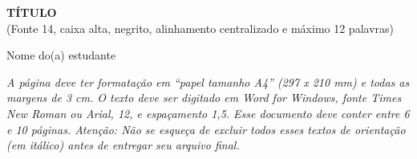 \begin{center}
{\Large\bfseries\MakeUppercase{TÍTULO}}\\[0.3\baselineskip]
{\footnotesize (Fonte 14, caixa alta, negrito, alinhamento centralizado e máximo 12 palavras)}
\end{center}

\vspace{0.7\baselineskip}
\begin{flushright}
Nome do(a) estudante
\end{flushright}

\vspace{1.2\baselineskip}
\textit{A página deve ter formatação em ``papel tamanho A4'' (297 x 210 mm) e todas as margens de 3 cm. O texto deve ser digitado em Word for Windows, fonte Times New Roman ou Arial, 12, e espaçamento 1,5. Esse documento deve conter entre 6 e 10 páginas. Atenção: Não se esqueça de excluir todos esses textos de orientação (em itálico) antes de entregar seu arquivo final.}
